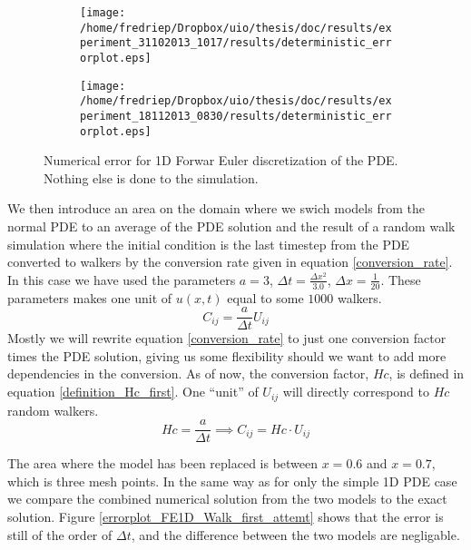 \begin{figure}[H]
\centering
\begin{subfigure}[b]{0.48\textwidth}
\texttt{[image: /home/fredriep/Dropbox/uio/thesis/doc/results/experiment\_31102013\_1017/results/deterministic\_errorplot.eps]}
\caption{}
\label{errorplot_FE1D_noWalk}
\end{subfigure}
\begin{subfigure}[b]{0.48\textwidth}
 \texttt{[image: /home/fredriep/Dropbox/uio/thesis/doc/results/experiment\_18112013\_0830/results/deterministic\_errorplot.eps]}
 \caption{}
 \label{errorplot_FE1D_noWalk_long}
\end{subfigure}
\caption[Numerical error for 1D Forwar Euler discretization]{Numerical error for 1D Forwar Euler discretization of the PDE. Nothing else is done to the simulation.}
\label{errorplot_FE1D_noWalk_super}
\end{figure}

We then introduce an area on the domain where we swich models from the normal PDE to an average of the PDE solution and the result of a random walk simulation where the initial condition is the last timestep from the PDE converted to walkers by the conversion rate given in equation \ref{conversion_rate}. In this case we have used the parameters $a=3$, $\Delta t = \frac{\Delta x^2}{3.0}$, $\Delta x = \frac{1}{20}$. 
These parameters makes one unit of $u(x,t)$ equal to some $1000$ walkers. 
\begin{equation}\label{conversion_rate}
 C_{ij} = \frac{a}{\Delta t}U_{ij}
\end{equation}
Mostly we will rewrite equation \ref{conversion_rate} to just one conversion factor times the PDE solution, giving us some flexibility should we want to add more dependencies in the conversion. 
As of now, the conversion factor, $Hc$, is defined in equation \ref{definition_Hc_first}. 
One ``unit'' of $ U_{ij}$ will directly correspond to $Hc$ random walkers.
\begin{equation}\label{definition_Hc_first}
 Hc =  \frac{a}{\Delta t} \implies C_{ij} = Hc\cdot U_{ij}
\end{equation}

The area where the model has been replaced is between $x=0.6$ and $x=0.7$, which is three mesh points. 
In the same way as for only the simple 1D PDE case we compare the combined numerical solution from the two models to the exact solution. 
Figure \ref{errorplot_FE1D_Walk_first_attemt} shows that the error is still of the order of $\Delta t$, and the difference between the two models are negligable. 

